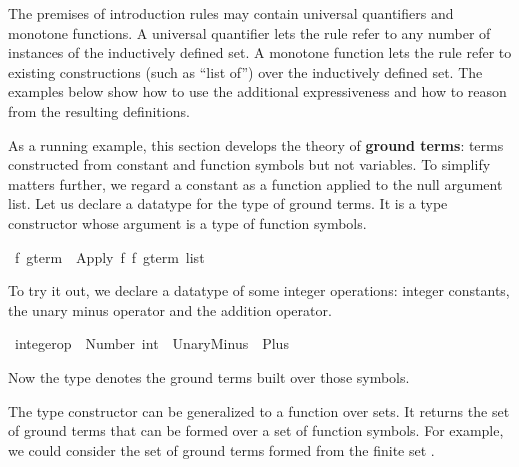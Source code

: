 %
\begin{isabellebody}%
\def\isabellecontext{Advanced}%
%
\isadelimtheory
%
\endisadelimtheory
%
\isatagtheory
%
\endisatagtheory
{\isafoldtheory}%
%
\isadelimtheory
%
\endisadelimtheory
%
\begin{isamarkuptext}%
The premises of introduction rules may contain universal quantifiers and
monotone functions.  A universal quantifier lets the rule 
refer to any number of instances of 
the inductively defined set.  A monotone function lets the rule refer
to existing constructions (such as ``list of'') over the inductively defined
set.  The examples below show how to use the additional expressiveness
and how to reason from the resulting definitions.%
\end{isamarkuptext}%
\isamarkuptrue%
%
\isamarkuptrue%
%
\begin{isamarkuptext}%
%
%
As a running example, this section develops the theory of \textbf{ground
terms}: terms constructed from constant and function 
symbols but not variables. To simplify matters further, we regard a
constant as a function applied to the null argument  list.  Let us declare a
datatype  for the type of ground  terms. It is a type constructor
whose argument is a type of  function symbols.%
\end{isamarkuptext}%
\isamarkuptrue%
\isamarkupfalse%
\ {\isacharprime}f\ gterm\ {\isacharequal}\ Apply\ {\isacharprime}f\ {\isachardoublequoteopen}{\isacharprime}f\ gterm\ list{\isachardoublequoteclose}%
\begin{isamarkuptext}%
To try it out, we declare a datatype of some integer operations: 
integer constants, the unary minus operator and the addition 
operator.%
\end{isamarkuptext}%
\isamarkuptrue%
\isamarkupfalse%
\ integer{\isacharunderscore}op\ {\isacharequal}\ Number\ int\ {\isacharbar}\ UnaryMinus\ {\isacharbar}\ Plus%
\begin{isamarkuptext}%
Now the type  denotes the ground 
terms built over those symbols.

The type constructor  can be generalized to a function 
over sets.  It returns 
the set of ground terms that can be formed over a set  of function symbols. For
example,  we could consider the set of ground terms formed from the finite 
set .


\end{isamarkuptext}
\end{isabellebody}

